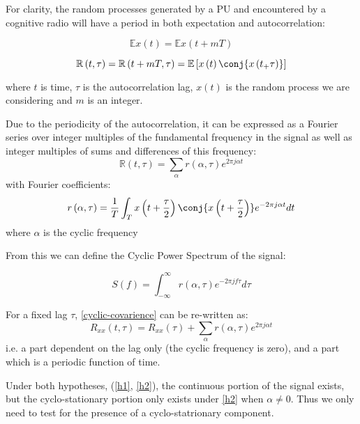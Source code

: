 For clarity, the random processes generated by a PU and encountered by a cognitive radio will have a period in both expectation and autocorrelation:

\begin{equation}
\mathbb{E}x\left(t\right) = \mathbb{E}x\left(t + mT\right) 
\end{equation}

\begin{equation}
\mathbb{R} \left( t, \tau \right) = \mathbb{R}\left(t + mT, \tau \right) = \mathbb{E} \left[ x \left(t \right)\conj{x \left(t_+\tau \right)} \right]
\end{equation}

where \(t\) is time, \(\tau\) is the autocorrelation lag, \(x\left(t\right)\) is the random process we are considering and \(m\) is an integer. 

Due to the periodicity of the autocorrelation, it can be expressed as a Fourier series over integer multiples of the fundamental frequency in the signal as well as integer multiples of sums and differences of this frequency:
%
\begin{equation}
\mathbb{R}\left(t, \tau\right) = \sum_{\alpha} r\left(\alpha, \tau\right) e^{2\pi j \alpha t}  
\end{equation}
\label{cyclic-covarience}
%
with Fourier coefficients:
%
\begin{equation}
r\left(\alpha, \tau\right) = \frac{1}{T} \int_{T} x\left(t+\frac{\tau}{2}\right)\conj{x\left(t+\frac{\tau}{2}\right)} e^{-2\pi j \alpha t} dt
\end{equation}
%
where \(\alpha\) is the cyclic frequency

From this we can define the Cyclic Power Spectrum of the signal:

\begin{equation}
S\left(f\right) = \int_{-\infty}^{\infty} r\left(\alpha, \tau\right) e^{-2 \pi j f \tau} d\tau
\end{equation}

For a fixed lag \(\tau\), \ref{cyclic-covarience} can be re-written as:
%
\begin{equation}
R_{xx}\left(t, \tau \right) = R_{xx}\left(\tau\right) + \sum_{\alpha} r\left(\alpha, \tau\right) e^{2\pi j \alpha t}  
\end{equation}
%
i.e. a part dependent on the lag only (the cyclic frequency is zero), and a part which is a periodic function of time. 

Under both hypotheses, (\ref{h1}, \ref{h2}), the continuous portion of the signal exists, but the cyclo-stationary portion only exists under \ref{h2} when \(\alpha \neq 0\). Thus we only need to test for the presence of a cyclo-statrionary component. 

